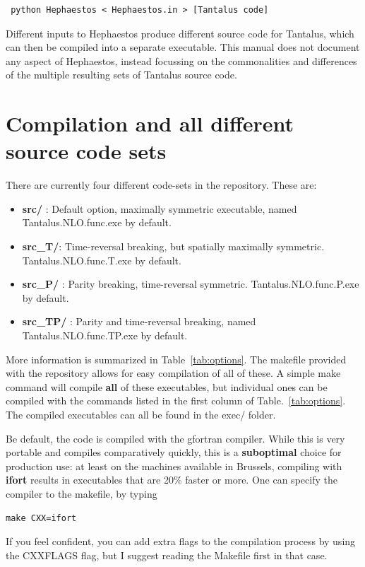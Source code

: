 \documentclass[print,amsmath,amssymb,aps,prc,nofootinbib,notitlepage]{revtex4-1}
\begin{document}
\begin{verbatim}
 python Hephaestos < Hephaestos.in > [Tantalus code]
\end{verbatim}

Different inputs to Hephaestos produce different source code for Tantalus, which
can then be compiled into a separate executable. This manual does not document 
any aspect of Hephaestos, instead focussing on the commonalities and differences
of the multiple resulting sets of Tantalus source code. 

\section{Compilation and all different source code sets}

There are currently four different code-sets in the repository. These are:
%
\begin{itemize}
\item \textbf{src/} : Default option, maximally symmetric executable, named 
                      \textsf{Tantalus.NLO.func.exe} by default.
\item \textbf{src\_T/}: Time-reversal breaking, but spatially maximally symmetric.
                       \textsf{Tantalus.NLO.func.T.exe} by default.
\item \textbf{src\_P/} : Parity breaking, time-reversal symmetric. 
                       \textsf{Tantalus.NLO.func.P.exe} by default.
\item \textbf{src\_TP/} : Parity and time-reversal breaking, named 
                      \textsf{Tantalus.NLO.func.TP.exe} by default.
\end{itemize}
%
More information is summarized in Table~\ref{tab:options}.
The makefile provided with the repository allows for easy compilation of all 
of these. A simple \textsf{make} command will compile \textbf{all} of these
executables, but individual ones can be compiled with the commands listed in 
the first column of Table.~\ref{tab:options}. The compiled executables can 
all be found in the \textsf{exec/} folder. 

Be default, the code is compiled with the \textsf{gfortran} compiler. While
this is very portable and compiles comparatively quickly, this is a \textbf{suboptimal}
choice for production use: at least on the machines available in Brussels, compiling 
with \textbf{\textsf{ifort}} results in executables that are 20\% faster or more. 
One can specify the compiler to the makefile, by typing 
%
\begin{verbatim}
make CXX=ifort
\end{verbatim}
%
If you feel confident, you can add extra flags to the compilation process by 
using the \textsf{CXXFLAGS} flag, but I suggest reading the Makefile first in 
that case.
\end{document}
